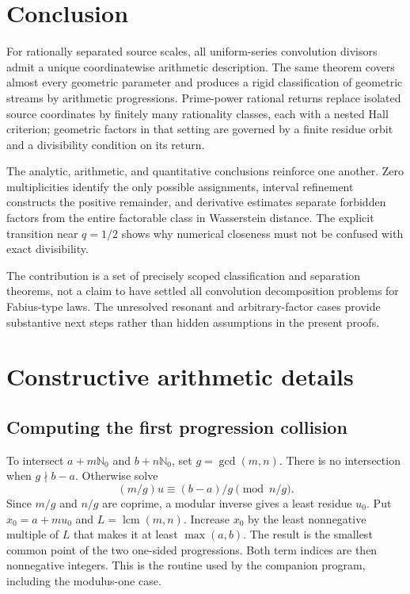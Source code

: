 \documentclass[11pt,letterpaper]{article}
\theoremstyle{definition}
\theoremstyle{remark}
\newcommand{\N}{\mathbb N_0}
\newcommand{\lcm}{\operatorname{lcm}}
\numberwithin{equation}{section}
\begin{document}
\section{Conclusion}
For rationally separated source scales, all uniform-series convolution divisors admit a unique coordinatewise arithmetic description. The same theorem covers almost every geometric parameter and produces a rigid classification of geometric streams by arithmetic progressions. Prime-power rational returns replace isolated source coordinates by finitely many rationality classes, each with a nested Hall criterion; geometric factors in that setting are governed by a finite residue orbit and a divisibility condition on its return.

The analytic, arithmetic, and quantitative conclusions reinforce one another. Zero multiplicities identify the only possible assignments, interval refinement constructs the positive remainder, and derivative estimates separate forbidden factors from the entire factorable class in Wasserstein distance. The explicit transition near $q=1/2$ shows why numerical closeness must not be confused with exact divisibility.

The contribution is a set of precisely scoped classification and separation theorems, not a claim to have settled all convolution decomposition problems for Fabius-type laws. The unresolved resonant and arbitrary-factor cases provide substantive next steps rather than hidden assumptions in the present proofs.

\appendix
\section{Constructive arithmetic details}\label{app:algorithms}
\subsection{Computing the first progression collision}
To intersect $a+m\N$ and $b+n\N$, set $g=\gcd(m,n)$. There is no intersection when $g\nmid b-a$. Otherwise solve
\[
 (m/g)u\equiv(b-a)/g\pmod{n/g}.
\]
Since $m/g$ and $n/g$ are coprime, a modular inverse gives a least residue $u_0$. Put $x_0=a+mu_0$ and $L=\lcm(m,n)$. Increase $x_0$ by the least nonnegative multiple of $L$ that makes it at least $\max(a,b)$. The result is the smallest common point of the two one-sided progressions. Both term indices are then nonnegative integers. This is the routine used by the companion program, including the modulus-one case.
\end{document}
